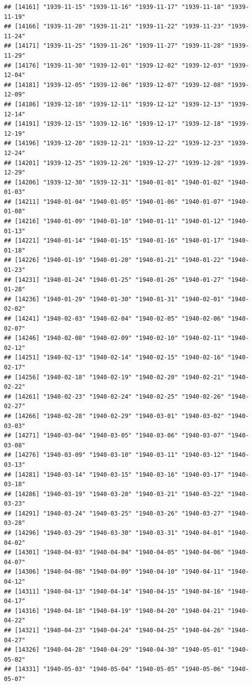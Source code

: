 \documentclass{article}\usepackage[]{graphicx}\usepackage[]{color}
\makeatletter
\newenvironment{kframe}{%
 \def\at@end@of@kframe{}%
 \ifinner\ifhmode%
  \def\at@end@of@kframe{\end{minipage}}%
  \begin{minipage}{\columnwidth}%
 \fi\fi%
 \def\FrameCommand##1{\hskip\@totalleftmargin \hskip-\fboxsep
 \colorbox{shadecolor}{##1}\hskip-\fboxsep
     \hskip-\linewidth \hskip-\@totalleftmargin \hskip\columnwidth}%
 \MakeFramed {\advance\hsize-\width
   \@totalleftmargin\z@ \linewidth\hsize
   \@setminipage}}%
 {\par\unskip\endMakeFramed%
 \at@end@of@kframe}
\newenvironment{knitrout}{}{} %
\makeatother
\begin{document}
\begin{description}
\begin{knitrout}
\begin{kframe}
\begin{verbatim}
## [14161] "1939-11-15" "1939-11-16" "1939-11-17" "1939-11-18" "1939-11-19"
## [14166] "1939-11-20" "1939-11-21" "1939-11-22" "1939-11-23" "1939-11-24"
## [14171] "1939-11-25" "1939-11-26" "1939-11-27" "1939-11-28" "1939-11-29"
## [14176] "1939-11-30" "1939-12-01" "1939-12-02" "1939-12-03" "1939-12-04"
## [14181] "1939-12-05" "1939-12-06" "1939-12-07" "1939-12-08" "1939-12-09"
## [14186] "1939-12-10" "1939-12-11" "1939-12-12" "1939-12-13" "1939-12-14"
## [14191] "1939-12-15" "1939-12-16" "1939-12-17" "1939-12-18" "1939-12-19"
## [14196] "1939-12-20" "1939-12-21" "1939-12-22" "1939-12-23" "1939-12-24"
## [14201] "1939-12-25" "1939-12-26" "1939-12-27" "1939-12-28" "1939-12-29"
## [14206] "1939-12-30" "1939-12-31" "1940-01-01" "1940-01-02" "1940-01-03"
## [14211] "1940-01-04" "1940-01-05" "1940-01-06" "1940-01-07" "1940-01-08"
## [14216] "1940-01-09" "1940-01-10" "1940-01-11" "1940-01-12" "1940-01-13"
## [14221] "1940-01-14" "1940-01-15" "1940-01-16" "1940-01-17" "1940-01-18"
## [14226] "1940-01-19" "1940-01-20" "1940-01-21" "1940-01-22" "1940-01-23"
## [14231] "1940-01-24" "1940-01-25" "1940-01-26" "1940-01-27" "1940-01-28"
## [14236] "1940-01-29" "1940-01-30" "1940-01-31" "1940-02-01" "1940-02-02"
## [14241] "1940-02-03" "1940-02-04" "1940-02-05" "1940-02-06" "1940-02-07"
## [14246] "1940-02-08" "1940-02-09" "1940-02-10" "1940-02-11" "1940-02-12"
## [14251] "1940-02-13" "1940-02-14" "1940-02-15" "1940-02-16" "1940-02-17"
## [14256] "1940-02-18" "1940-02-19" "1940-02-20" "1940-02-21" "1940-02-22"
## [14261] "1940-02-23" "1940-02-24" "1940-02-25" "1940-02-26" "1940-02-27"
## [14266] "1940-02-28" "1940-02-29" "1940-03-01" "1940-03-02" "1940-03-03"
## [14271] "1940-03-04" "1940-03-05" "1940-03-06" "1940-03-07" "1940-03-08"
## [14276] "1940-03-09" "1940-03-10" "1940-03-11" "1940-03-12" "1940-03-13"
## [14281] "1940-03-14" "1940-03-15" "1940-03-16" "1940-03-17" "1940-03-18"
## [14286] "1940-03-19" "1940-03-20" "1940-03-21" "1940-03-22" "1940-03-23"
## [14291] "1940-03-24" "1940-03-25" "1940-03-26" "1940-03-27" "1940-03-28"
## [14296] "1940-03-29" "1940-03-30" "1940-03-31" "1940-04-01" "1940-04-02"
## [14301] "1940-04-03" "1940-04-04" "1940-04-05" "1940-04-06" "1940-04-07"
## [14306] "1940-04-08" "1940-04-09" "1940-04-10" "1940-04-11" "1940-04-12"
## [14311] "1940-04-13" "1940-04-14" "1940-04-15" "1940-04-16" "1940-04-17"
## [14316] "1940-04-18" "1940-04-19" "1940-04-20" "1940-04-21" "1940-04-22"
## [14321] "1940-04-23" "1940-04-24" "1940-04-25" "1940-04-26" "1940-04-27"
## [14326] "1940-04-28" "1940-04-29" "1940-04-30" "1940-05-01" "1940-05-02"
## [14331] "1940-05-03" "1940-05-04" "1940-05-05" "1940-05-06" "1940-05-07"

\end{verbatim}
\end{kframe}
\end{knitrout}
\end{description}
\end{document}
